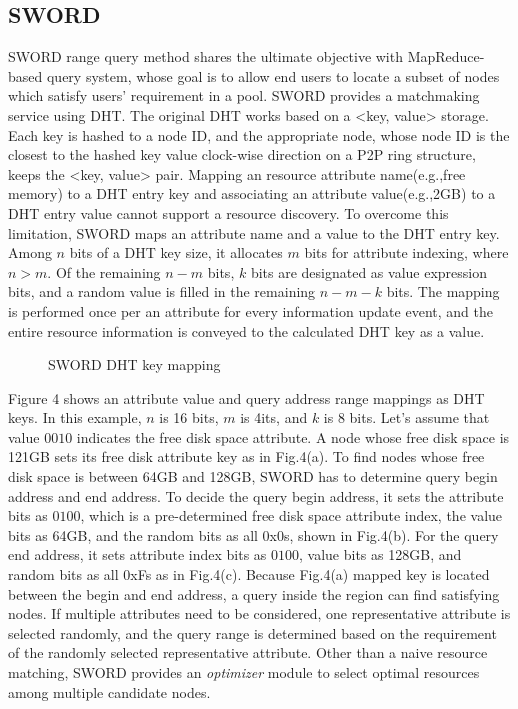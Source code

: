 \documentclass{acm_proc_article-sp}
\begin{document}
\subsection{SWORD}
SWORD range query method shares the ultimate objective with MapReduce-based query system, whose goal is to allow end users to locate a subset of nodes which satisfy users' requirement in a pool.
SWORD provides a matchmaking service using DHT. The original DHT works based on a <key, value> storage. 
Each key is hashed to a node ID, and the appropriate node, whose node ID is the closest to the hashed key value clock-wise direction on a P2P ring structure\cite{chord}\cite{pastry}, keeps the <key, value> pair. 
Mapping an resource attribute name(e.g.,free memory) to a DHT entry key and associating an attribute value(e.g.,2GB) to a DHT entry value cannot support a resource discovery. 
To overcome this limitation, SWORD maps an attribute name and a value to the DHT entry key. Among $n$ bits of a DHT key size, it allocates $m$ bits for attribute indexing, where $n>m$. 
Of the remaining $n-m$ bits, $k$ bits are designated as value expression bits, and a random value is filled in the remaining $n-m-k$ bits.
The mapping is performed once per an attribute for every information update event, and the entire resource information is conveyed to the calculated DHT key as a value.
\begin{figure}
\centering
{}
\caption{SWORD DHT key mapping}
\end{figure}
Figure 4 shows an attribute value and query address range mappings as DHT keys. In this example, $n$ is 16 bits, $m$ is 4its, and $k$ is 8 bits. Let's assume that value $0010$ indicates the free disk space attribute.
A node whose free disk space is 121GB sets its free disk attribute key as in Fig.4(a).
To find nodes whose free disk space is between 64GB and 128GB, SWORD has to determine query begin address and end address. 
To decide the query begin address, it sets the attribute bits as $0100$, which is a pre-determined free disk space attribute index, the value bits as 64GB, and the random bits as all 0x0s, shown in Fig.4(b).
For the query end address, it sets attribute index bits as $0100$, value bits as 128GB, and random bits as all 0xFs as in Fig.4(c).
Because Fig.4(a) mapped key is located between the begin and end address, a query inside the region can find satisfying nodes. 
If multiple attributes need to be considered, one representative attribute is selected randomly, and the query range is determined based on the requirement of the randomly selected representative attribute.
Other than a naive resource matching, SWORD provides an \textit{optimizer} module to select optimal resources among multiple candidate nodes. 
\end{document}
